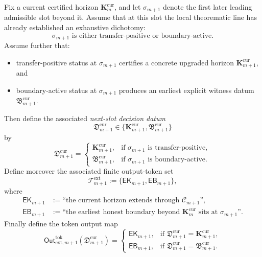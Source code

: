\begin{definition}
\label{def:reusable-next-slot-decision-schema}
Fix a current certified horizon $\mathbf K_m^{\mathrm{cur}}$, and let $\sigma_{m+1}$ denote the first later leading admissible slot beyond it. Assume that at this slot the local theorematic line has already established an exhaustive dichotomy:
\[
\text{$\sigma_{m+1}$ is either transfer-positive or boundary-active.}
\]
Assume further that:
\begin{itemize}[leftmargin=2em]
 \item transfer-positive status at $\sigma_{m+1}$ certifies a concrete upgraded horizon $\mathbf K_{m+1}^{\mathrm{cur}}$, and
 \item boundary-active status at $\sigma_{m+1}$ produces an earliest explicit witness datum $\mathfrak B_{m+1}^{\mathrm{cur}}$.
\end{itemize}
Then define the associated \emph{next-slot decision datum}
\[
 \mathfrak D_{m+1}^{\mathrm{cur}}
 \in
 \{\mathbf K_{m+1}^{\mathrm{cur}},\mathfrak B_{m+1}^{\mathrm{cur}}\}
\]
by
\[
 \mathfrak D_{m+1}^{\mathrm{cur}}
 =
 \begin{cases}
 \mathbf K_{m+1}^{\mathrm{cur}}, & \text{if }\sigma_{m+1}\text{ is transfer-positive},\\[2mm]
 \mathfrak B_{m+1}^{\mathrm{cur}}, & \text{if }\sigma_{m+1}\text{ is boundary-active}.
 \end{cases}
\]
Define moreover the associated finite output-token set
\[
 \mathcal T^{\mathrm{ext}}_{m+1}
 :=
 \{\mathsf{EK}_{m+1},\mathsf{EB}_{m+1}\},
\]
where
\begin{align*}
 \mathsf{EK}_{m+1} &:= \text{``the current horizon extends through }\mathcal C_{m+1}\text{''},\\
 \mathsf{EB}_{m+1} &:= \text{``the earliest honest boundary beyond }\mathbf K_m^{\mathrm{cur}}\text{ sits at }\sigma_{m+1}\text{''}.
\end{align*}
Finally define the token output map
\[
 \mathsf{Out}^{\mathrm{tok}}_{\mathrm{ext},m+1}(\mathfrak D_{m+1}^{\mathrm{cur}})
 =
 \begin{cases}
 \mathsf{EK}_{m+1}, & \text{if }\mathfrak D_{m+1}^{\mathrm{cur}}=\mathbf K_{m+1}^{\mathrm{cur}},\\[2mm]
 \mathsf{EB}_{m+1}, & \text{if }\mathfrak D_{m+1}^{\mathrm{cur}}=\mathfrak B_{m+1}^{\mathrm{cur}}.
 \end{cases}
\]
\end{definition}

